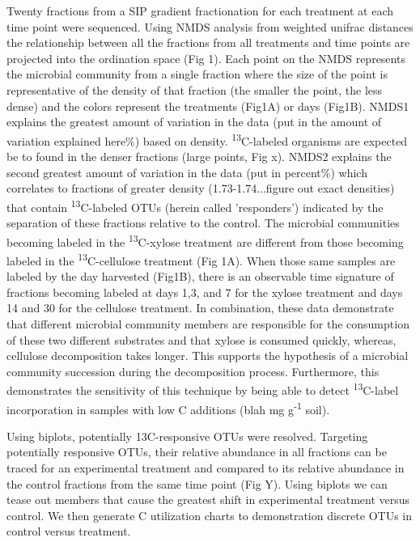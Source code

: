Twenty fractions from a SIP gradient fractionation for each treatment at each time point were sequenced. Using NMDS analysis from weighted unifrac distances the relationship between all the fractions from all treatments and time points are projected into the ordination space (Fig 1). Each point on the NMDS represents the microbial community from a single fraction where the size of the point is representative of the density of that fraction (the smaller the point, the less dense) and the colors represent the treatments (Fig1A) or days (Fig1B). NMDS1 explains the greatest amount of variation in the data (put in the amount of variation explained here\%) based on density. \textsuperscript{13}C-labeled organisms are expected be to found in the denser fractions (large points, Fig x). NMDS2 explains the second greatest amount of variation in the data (put in percent\%) which correlates to fractions of greater density (1.73-1.74...figure out exact densities) that contain \textsuperscript{13}C-labeled OTUs (herein called 'responders') indicated by the separation of these fractions relative to the control.  The microbial communities becoming labeled in the \textsuperscript{13}C-xylose treatment are different from those becoming labeled in the \textsuperscript{13}C-cellulose treatment (Fig 1A).  When those same samples are labeled by the day harvested (Fig1B), there is an observable time signature of fractions becoming labeled at days 1,3, and 7 for the xylose treatment and days 14 and 30 for the cellulose treatment.  In combination, these data demonstrate that different microbial community members are responsible for the consumption of these two different substrates and that xylose is consumed quickly, whereas, cellulose decomposition takes longer.  This supports the hypothesis of a microbial community succession during the decomposition process.  Furthermore, this demonstrates the sensitivity of this technique by being able to detect \textsuperscript{13}C-label incorporation in samples with low C additions (blah mg g\textsuperscript{-1} soil).    

Using biplots, potentially 13C-responsive OTUs were resolved.  Targeting potentially responsive OTUs, their relative abundance in all fractions can be traced for an experimental treatment and compared to its relative abundance in the control fractions from the same time point (Fig Y). Using biplots we can tease out members that cause the greatest shift in experimental treatment versus control.  We then generate C utilization charts to demonstration discrete OTUs in control versus treatment.        
          
